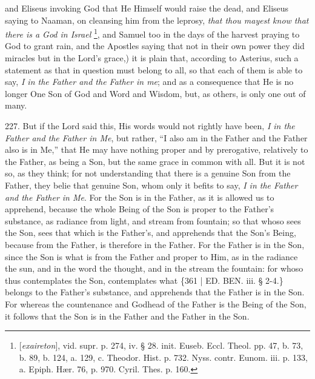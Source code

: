 and Eliseus invoking God that He Himself would raise the dead, and
Eliseus saying to Naaman, on cleansing him from the leprosy, \emph{that
thou mayest know that there is a God in Israel} \footnote{[\emph{exaireton}], vid. supr. p. 274, iv. § 28. init. Euseb. Eccl. Theol.
pp. 47, b. 73, b. 89, b. 124, a. 129, c. Theodor. Hist. p. 732. Nyss.
contr. Eunom. iii. p. 133, a. Epiph. Hær. 76, p. 970. Cyril. Thes. p.
160.}, and Samuel too in the days of the harvest praying to God to
grant rain, and the Apostles saying that not in their own power they
did miracles but in the Lord's grace,) it is plain that, according to
Asterius, such a statement as that in question must belong to all, so
that each of them is able to say, \emph{I in the Father and the Father in
me}; and as a consequence that He is no longer One Son of God and
Word and Wisdom, but, as others, is only one out of many.

227. But if
the Lord said this, His words would not rightly have been, \emph{I in the
Father and the Father in Me}, but rather, ``I also am in the Father
and the Father also is in Me,'' that He may have nothing proper and by
prerogative, relatively to the Father, as being a Son, but the same
grace in common with all. But it is not so, as they think; for not
understanding that there is a genuine Son from the Father, they belie
that genuine Son, whom only it befits to say, \emph{I in the Father and
the Father in Me}. For the Son is in the Father, as it is allowed
us to apprehend, because the whole Being of the Son is proper to the
Father's substance, as radiance from light, and stream from fountain;
so that whoso sees the Son, sees that which is the Father's, and
apprehends that the Son's Being, because from the Father, is therefore
in the Father. For the Father is in the Son, since the Son is what is
from the Father and proper to Him, as in the radiance the sun, and in
the word the thought, and in the stream the fountain: for whoso thus
contemplates the Son, contemplates what \{361 | ED.
BEN. iii. § 2-4.\} belongs to the Father's
substance, and apprehends that the Father is in the Son. For whereas
the countenance and Godhead of the Father is the Being of the Son, it
follows that the Son is in the Father and the Father in the Son.

